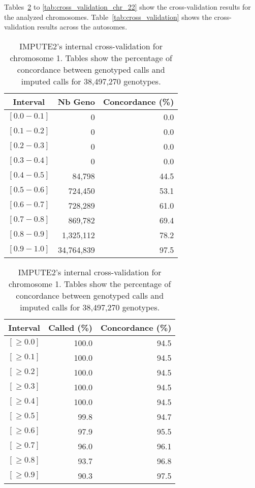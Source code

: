 \documentclass[10pt,twoside,english]{scrartcl}
\begin{document}
Tables~\ref{tab:cross_validation_chr_1} to
\ref{tab:cross_validation_chr_22} show the cross-validation
results for the analyzed chromosomes. Table~\ref{tab:cross_validation} shows
the cross-validation results across the autosomes.


\begin{table}[H]
\protect\caption{IMPUTE2's internal cross-validation for chromosome 1. Tables show the
percentage of concordance between genotyped calls and imputed calls
for 38,497,270 genotypes.\label{tab:cross_validation_chr_1}}

\centering

\begin{tabular}{crr}
\hline 
\multicolumn{1}{c}{\textbf{Interval}}
 & \multicolumn{1}{c}{\textbf{Nb Geno}}
 & \multicolumn{1}{c}{\textbf{Concordance (\%)}}
\\
\hline 

$[0.0-0.1]$ & 0 & 0.0\\
$[0.1-0.2]$ & 0 & 0.0\\
$[0.2-0.3]$ & 0 & 0.0\\
$[0.3-0.4]$ & 0 & 0.0\\
$[0.4-0.5]$ & 84,798 & 44.5\\
$[0.5-0.6]$ & 724,450 & 53.1\\
$[0.6-0.7]$ & 728,289 & 61.0\\
$[0.7-0.8]$ & 869,782 & 69.4\\
$[0.8-0.9]$ & 1,325,112 & 78.2\\
$[0.9-1.0]$ & 34,764,839 & 97.5\\
\hline 
\end{tabular}
\hfill
\begin{tabular}{crr}
\hline 
\multicolumn{1}{c}{\textbf{Interval}}
 & \multicolumn{1}{c}{\textbf{Called (\%)}}
 & \multicolumn{1}{c}{\textbf{Concordance (\%)}}
\\
\hline 

$[\geq 0.0]$ & 100.0 & 94.5\\
$[\geq 0.1]$ & 100.0 & 94.5\\
$[\geq 0.2]$ & 100.0 & 94.5\\
$[\geq 0.3]$ & 100.0 & 94.5\\
$[\geq 0.4]$ & 100.0 & 94.5\\
$[\geq 0.5]$ & 99.8 & 94.7\\
$[\geq 0.6]$ & 97.9 & 95.5\\
$[\geq 0.7]$ & 96.0 & 96.1\\
$[\geq 0.8]$ & 93.7 & 96.8\\
$[\geq 0.9]$ & 90.3 & 97.5\\
\hline 
\end{tabular}


\end{table}
\end{document}
